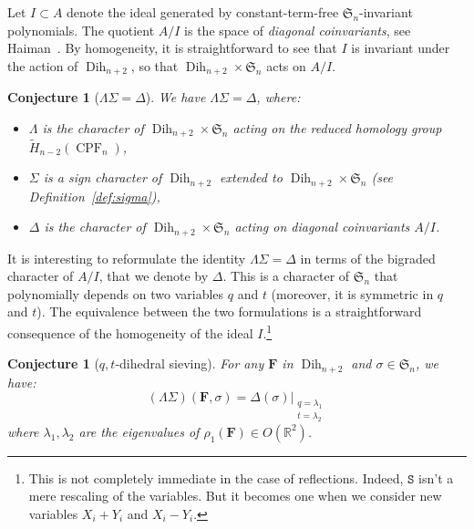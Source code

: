 \documentclass[11pt]{article}
\newtheorem{conj}[theo]{Conjecture}
\theoremstyle{definition}
\DeclareMathOperator{\dih}{Dih}
\newcommand{\FFF}{\mathbf{F}}
\newcommand{\RRR}{\mathbf{R}}
\newcommand{\SSS}{\mathbf{S}}
\newcommand{\SSSS}{\mathtt{S}}
\DeclareMathOperator{\CPF}{CPF}
\begin{document}
Let $I \subset A$ denote the ideal generated by constant-term-free $\mathfrak{S}_n$-invariant polynomials.  The quotient $A/I$ is the space of {\it diagonal coinvariants}, see Haiman~\cite{haiman}.  By homogeneity, it is straightforward to see that $I$ is invariant under the action of $\dih_{n+2}$, so that $\dih_{n+2}\times \mathfrak{S}_n$ acts on $A/I$.

\begin{conj}[$\Lambda\Sigma = \Delta$]  \label{conj1}
    We have $\Lambda\Sigma = \Delta$, where:
    \begin{itemize}    
        \item $\Lambda$ is the character of $\dih_{n+2}\times \mathfrak{S}_n$ acting on the reduced homology group $\tilde H_{n-2}(\CPF_n)$,
        \item $\Sigma$ is a sign character of $\dih_{n+2}$ extended to $\dih_{n+2}\times \mathfrak{S}_n$ (see Definition~\ref{def:sigma}),
        \item $\Delta$ is the character of $\dih_{n+2}\times \mathfrak{S}_n$ acting on diagonal coinvariants $A/I$.
    \end{itemize}
\end{conj}
    

It is interesting to reformulate the identity $\Lambda\Sigma = \Delta$ in terms of the bigraded character of $A/I$, that we denote by $\varDelta$.  This is a character of $\mathfrak{S}_n$ that polynomially depends on two variables $q$ and $t$ (moreover, it is symmetric in $q$ and $t$).  The equivalence between the two formulations is a straightforward consequence of the homogeneity of the ideal $I$.\footnote{This is not completely immediate in the case of reflections.  Indeed, $\SSSS$ isn't a mere rescaling of the variables.  But it becomes one when we consider new variables $X_i+Y_i$ and $X_i-Y_i$.} 

\begin{conj}[$q,t$-dihedral sieving] \label{conj2}
    For any $\FFF$ in $\dih_{n+2}$ and $\sigma\in\mathfrak{S}_n$, we have:
    \[
        (\Lambda\Sigma)(\FFF,\sigma) = \varDelta(\sigma)\Big\vert_{\substack{q=\lambda_1 \\ t=\lambda_2}}
    \]
    where $\lambda_1,\lambda_2$ are the eigenvalues of $\rho_1(\FFF) \in O(\mathbb{R}^2)$.
\end{conj}
\end{document}
